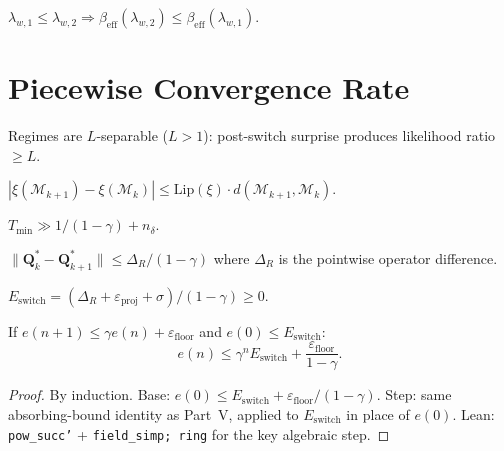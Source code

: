 \begin{theorem}
$\lambda_{w,1} \le \lambda_{w,2} \Rightarrow \beta_{\mathrm{eff}}(\lambda_{w,2}) \le \beta_{\mathrm{eff}}(\lambda_{w,1})$.
\end{theorem}


\section{Piecewise Convergence Rate}
\label{app:piecewise}

\begin{assumption}
\label{assump:separability}
Regimes are $L$-separable ($L > 1$): post-switch surprise produces likelihood ratio $\ge L$.
\end{assumption}

\begin{assumption}
\label{assump:lipschitz_surprise}
$|\xi(\mathcal{M}_{k+1}) - \xi(\mathcal{M}_k)| \le \mathrm{Lip}(\xi) \cdot d(\mathcal{M}_{k+1}, \mathcal{M}_k)$.
\end{assumption}

\begin{assumption}
\label{assump:metastable}
$T_{\min} \gg 1/(1{-}\gamma) + n_\delta$.
\end{assumption}

\begin{theorem}
$\|\mathbf{Q}^*_k - \mathbf{Q}^*_{k+1}\| \le \Delta_R/(1{-}\gamma)$ where $\Delta_R$ is the pointwise operator difference.
\end{theorem}

\begin{theorem}
$E_{\mathrm{switch}} = (\Delta_R + \varepsilon_{\mathrm{proj}} + \sigma)/(1{-}\gamma) \ge 0$.
\end{theorem}

\begin{theorem}
If $e(n+1) \le \gamma e(n) + \varepsilon_{\mathrm{floor}}$ and $e(0) \le E_{\mathrm{switch}}$:
\begin{equation}
    e(n) \le \gamma^n E_{\mathrm{switch}} + \frac{\varepsilon_{\mathrm{floor}}}{1 - \gamma}.
\end{equation}
\end{theorem}
\begin{proof}
By induction.  Base: $e(0) \le E_{\mathrm{switch}} + \varepsilon_{\mathrm{floor}}/(1{-}\gamma)$.  Step: same absorbing-bound identity as Part~V, applied to $E_{\mathrm{switch}}$ in place of $e(0)$.  Lean: \texttt{pow\_succ'} + \texttt{field\_simp; ring} for the key algebraic step.
\end{proof}

